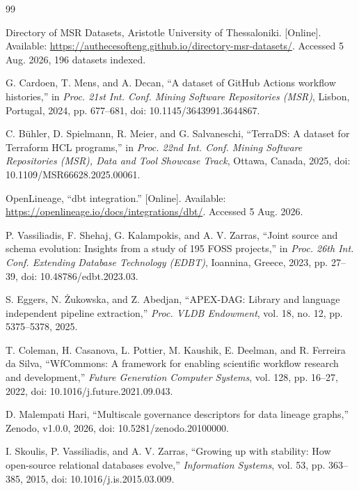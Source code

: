 \documentclass[10pt,conference]{IEEEtran}
\begin{document}
\begin{thebibliography}{99}

Directory of MSR Datasets, Aristotle University of Thessaloniki. [Online].
Available: \url{https://authecesofteng.github.io/directory-msr-datasets/}.
Accessed 5 Aug. 2026, 196 datasets indexed.

G. Cardoen, T. Mens, and A. Decan, ``A dataset of GitHub Actions workflow
histories,'' in \emph{Proc. 21st Int. Conf. Mining Software Repositories (MSR)},
Lisbon, Portugal, 2024, pp. 677--681, doi: 10.1145/3643991.3644867.

C. B\"{u}hler, D. Spielmann, R. Meier, and G. Salvaneschi, ``TerraDS: A dataset
for Terraform HCL programs,'' in \emph{Proc. 22nd Int. Conf. Mining Software
Repositories (MSR), Data and Tool Showcase Track}, Ottawa, Canada, 2025,
doi: 10.1109/MSR66628.2025.00061.

OpenLineage, ``dbt integration.'' [Online]. Available:
\url{https://openlineage.io/docs/integrations/dbt/}. Accessed 5 Aug. 2026.

P. Vassiliadis, F. Shehaj, G. Kalampokis, and A. V. Zarras, ``Joint source and
schema evolution: Insights from a study of 195 FOSS projects,'' in \emph{Proc.
26th Int. Conf. Extending Database Technology (EDBT)}, Ioannina, Greece, 2023,
pp. 27--39, doi: 10.48786/edbt.2023.03.

S. Eggers, N. \.{Z}ukowska, and Z. Abedjan, ``APEX-DAG: Library and language
independent pipeline extraction,'' \emph{Proc. VLDB Endowment}, vol. 18, no. 12,
pp. 5375--5378, 2025.

T. Coleman, H. Casanova, L. Pottier, M. Kaushik, E. Deelman, and R. Ferreira da
Silva, ``WfCommons: A framework for enabling scientific workflow research and
development,'' \emph{Future Generation Computer Systems}, vol. 128,
pp. 16--27, 2022, doi: 10.1016/j.future.2021.09.043.

D. Malempati Hari, ``Multiscale governance descriptors for data lineage graphs,''
Zenodo, v1.0.0, 2026, doi: 10.5281/zenodo.20100000.

I. Skoulis, P. Vassiliadis, and A. V. Zarras, ``Growing up with stability: How
open-source relational databases evolve,'' \emph{Information Systems}, vol. 53,
pp. 363--385, 2015, doi: 10.1016/j.is.2015.03.009.

\end{thebibliography}
\end{document}

